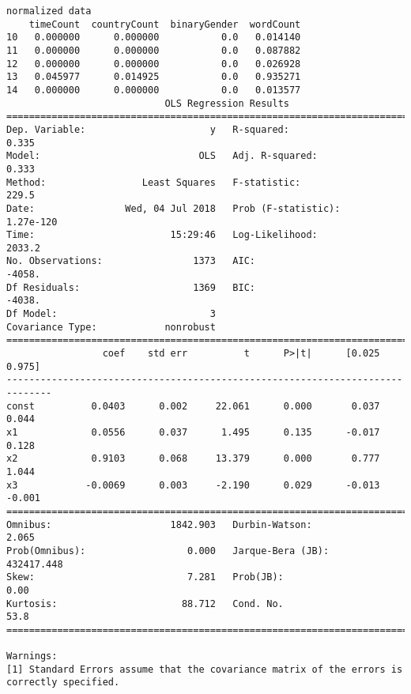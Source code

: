 \documentclass[11pt]{article}
\begin{document}
    \begin{Verbatim}[commandchars=\\\{\}]
normalized data
    timeCount  countryCount  binaryGender  wordCount
10   0.000000      0.000000           0.0   0.014140
11   0.000000      0.000000           0.0   0.087882
12   0.000000      0.000000           0.0   0.026928
13   0.045977      0.014925           0.0   0.935271
14   0.000000      0.000000           0.0   0.013577
                            OLS Regression Results                            
==============================================================================
Dep. Variable:                      y   R-squared:                       0.335
Model:                            OLS   Adj. R-squared:                  0.333
Method:                 Least Squares   F-statistic:                     229.5
Date:                Wed, 04 Jul 2018   Prob (F-statistic):          1.27e-120
Time:                        15:29:46   Log-Likelihood:                 2033.2
No. Observations:                1373   AIC:                            -4058.
Df Residuals:                    1369   BIC:                            -4038.
Df Model:                           3                                         
Covariance Type:            nonrobust                                         
==============================================================================
                 coef    std err          t      P>|t|      [0.025      0.975]
------------------------------------------------------------------------------
const          0.0403      0.002     22.061      0.000       0.037       0.044
x1             0.0556      0.037      1.495      0.135      -0.017       0.128
x2             0.9103      0.068     13.379      0.000       0.777       1.044
x3            -0.0069      0.003     -2.190      0.029      -0.013      -0.001
==============================================================================
Omnibus:                     1842.903   Durbin-Watson:                   2.065
Prob(Omnibus):                  0.000   Jarque-Bera (JB):           432417.448
Skew:                           7.281   Prob(JB):                         0.00
Kurtosis:                      88.712   Cond. No.                         53.8
==============================================================================

Warnings:
[1] Standard Errors assume that the covariance matrix of the errors is correctly specified.

    \end{Verbatim}
\end{document}
